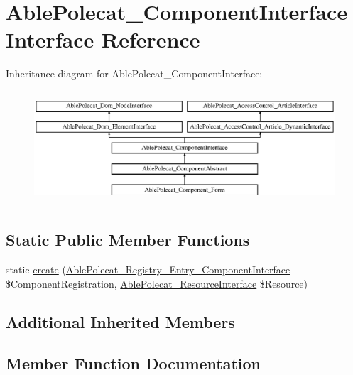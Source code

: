 \hypertarget{interface_able_polecat___component_interface}{}\section{Able\+Polecat\+\_\+\+Component\+Interface Interface Reference}
\label{interface_able_polecat___component_interface}
Inheritance diagram for Able\+Polecat\+\_\+\+Component\+Interface\+:\begin{figure}[H]
\begin{center}
\leavevmode
\includegraphics[height=4.268293cm]{interface_able_polecat___component_interface}
\end{center}
\end{figure}
\subsection*{Static Public Member Functions}
\begin{DoxyCompactItemize}
\item 
static \hyperlink{interface_able_polecat___component_interface_a9b5ffdd8a1445d0295c494b3277b313e}{create} (\hyperlink{interface_able_polecat___registry___entry___component_interface}{Able\+Polecat\+\_\+\+Registry\+\_\+\+Entry\+\_\+\+Component\+Interface} \$Component\+Registration, \hyperlink{interface_able_polecat___resource_interface}{Able\+Polecat\+\_\+\+Resource\+Interface} \$Resource)
\end{DoxyCompactItemize}
\subsection*{Additional Inherited Members}


\subsection{Member Function Documentation}
\hypertarget{interface_able_polecat___component_interface_a9b5ffdd8a1445d0295c494b3277b313e}{}
